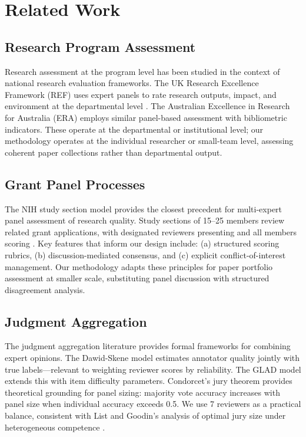 \section{Related Work}

\subsection{Research Program Assessment}

Research assessment at the program level has been studied in the context of national research evaluation frameworks. The UK Research Excellence Framework (REF) uses expert panels to rate research outputs, impact, and environment at the departmental level \cite{ref2021}. The Australian Excellence in Research for Australia (ERA) employs similar panel-based assessment with bibliometric indicators. These operate at the departmental or institutional level; our methodology operates at the individual researcher or small-team level, assessing coherent paper collections rather than departmental output.

\subsection{Grant Panel Processes}

The NIH study section model provides the closest precedent for multi-expert panel assessment of research quality. Study sections of 15--25 members review related grant applications, with designated reviewers presenting and all members scoring \cite{li2015nih}. Key features that inform our design include: (a) structured scoring rubrics, (b) discussion-mediated consensus, and (c) explicit conflict-of-interest management. Our methodology adapts these principles for paper portfolio assessment at smaller scale, substituting panel discussion with structured disagreement analysis.

\subsection{Judgment Aggregation}

The judgment aggregation literature provides formal frameworks for combining expert opinions. The Dawid-Skene model \cite{dawid1979maximum} estimates annotator quality jointly with true labels---relevant to weighting reviewer scores by reliability. The GLAD model \cite{whitehill2009whose} extends this with item difficulty parameters. Condorcet's jury theorem \cite{condorcet1785} provides theoretical grounding for panel sizing: majority vote accuracy increases with panel size when individual accuracy exceeds 0.5. We use 7 reviewers as a practical balance, consistent with List and Goodin's analysis of optimal jury size under heterogeneous competence \cite{list2001epistemic}.

